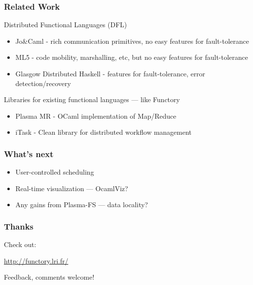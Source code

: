 \documentclass[xcolor=dvipsnames]{beamer}
\begin{document}
\begin{frame}\frametitle {Related Work}
  Distributed Functional Languages (DFL)
  \begin{itemize}
  \item Jo\&Caml - rich communication primitives, no easy features
    for fault-tolerance
  \item ML5 - code mobility, marshalling, etc, but no
    easy features for fault-tolerance
  \item Glasgow Distributed Haskell - features for fault-tolerance,
    error detection/recovery
  \end{itemize}


\bigskip
  Libraries for existing functional languages --- like Functory
  \begin{itemize}
  \item Plasma MR - OCaml implementation of Map/Reduce
  \item iTask - Clean library for distributed workflow management
  \end{itemize}

  
\end{frame}


\begin{frame}\frametitle {What's next}
  \begin{itemize}
  \item User-controlled scheduling
  \item Real-time visualization --- OcamlViz?
  \item Any gains from Plasma-FS --- data locality?
  \end{itemize}
\end{frame}


\begin{frame}\frametitle {Thanks}


\bigskip
Check out:
\begin{center}
 \textcolor{blue}{\url{http://functory.lri.fr/}}  
\end{center}

Feedback, comments welcome!

\end{frame}

\end{document}
